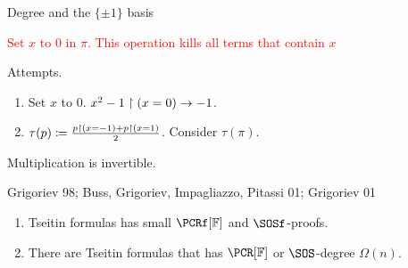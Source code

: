 \begin{frame}{Degree and the $\{\pm 1\}$ basis}
    \begin{center}
        \textcolor{red}{Set $x$ to $0$ in $\pi$. This operation kills all terms that contain $x$}
    \end{center}

    \pause
    \vspace{0.5cm}

    Attempts.
    \begin{enumerate}
        \item Set $x$ to $0$. \pause \hspace{1cm} $x^2 - 1 \rest (x = 0) \to -1$.
        \pause
        \item $\tau(p) \coloneqq \frac{p \rest (x = -1) + p \rest (x = 1)}{2}$. Consider $\tau(\pi)$.
    \end{enumerate}

    \pause

    \begin{minipage}{0.3\linewidth}
        \begin{prooftree}
        \end{prooftree}
    \end{minipage}
    \pause
    \begin{minipage}{0.3\linewidth}
        \begin{prooftree}
        \end{prooftree}
    \end{minipage}
    \pause
    \begin{minipage}{0.3\linewidth}
        \begin{prooftree}
        \end{prooftree}
    \end{minipage}

    \pause

    Multiplication is invertible.

    \pause


    \begin{block}{Grigoriev 98; Buss, Grigoriev, Impagliazzo, Pitassi 01; Grigoriev 01}
        \begin{enumerate}
            \item Tseitin formulas has small $\PCRf[\field]$ and $\SOSf$-proofs.
            \item There are Tseitin formulas that has $\PCR[\field]$ or $\SOS$-degree $\Omega(n)$.
        \end{enumerate}
    \end{block}
\end{frame}


